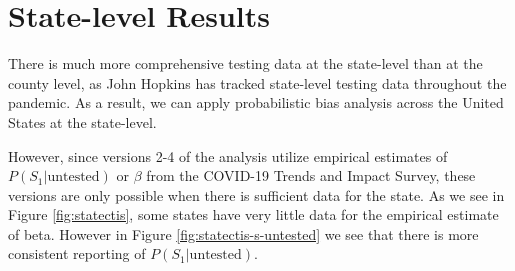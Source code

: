 \documentclass[12pt,twoside]{smiththesis}
\begin{document}
\hypertarget{state-level-results}{%
\section{State-level Results}\label{state-level-results}}

There is much more comprehensive testing data at the state-level than at the county level, as John Hopkins has tracked state-level testing data throughout the pandemic.
As a result, we can apply probabilistic bias analysis across the United States at the state-level.

However, since versions 2-4 of the analysis utilize empirical estimates of \(P(S_1|\text{untested})\) or \(\beta\) from the COVID-19 Trends and Impact Survey, these versions are only possible when there is sufficient data for the state. As we see in Figure \ref{fig:statectis}, some states have very little data for the empirical estimate of beta. However in Figure \ref{fig:statectis-s-untested} we see that there is more consistent reporting of \(P(S_1|\text{untested})\).
\end{document}
